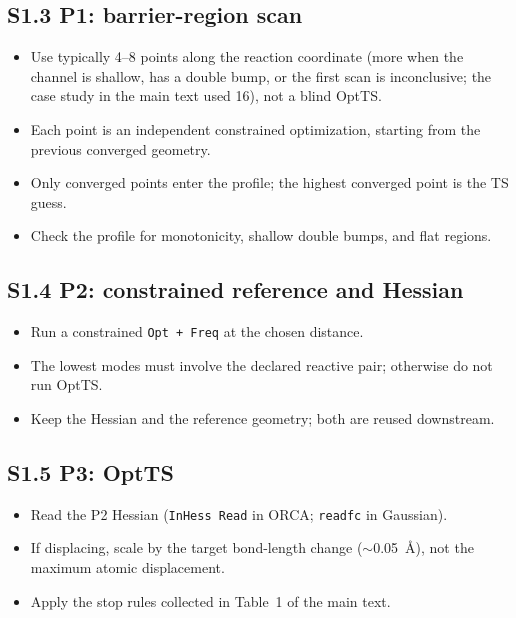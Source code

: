 \documentclass[11pt,a4paper]{article}
\begin{document}
\subsection*{S1.3 P1: barrier-region scan}
\begin{itemize}
\item Use typically 4--8 points along the reaction coordinate (more when the channel is shallow, has a double bump, or the first scan is inconclusive; the case study in the main text used 16), not a blind OptTS.
\item Each point is an independent constrained optimization, starting from the previous converged geometry.
\item Only converged points enter the profile; the highest converged point is the TS guess.
\item Check the profile for monotonicity, shallow double bumps, and flat regions.
\end{itemize}

\subsection*{S1.4 P2: constrained reference and Hessian}
\begin{itemize}
\item Run a constrained \texttt{Opt + Freq} at the chosen distance.
\item The lowest modes must involve the declared reactive pair; otherwise do not run OptTS.
\item Keep the Hessian and the reference geometry; both are reused downstream.
\end{itemize}

\subsection*{S1.5 P3: OptTS}
\begin{itemize}
\item Read the P2 Hessian (\texttt{InHess Read} in ORCA; \texttt{readfc} in Gaussian).
\item If displacing, scale by the target bond-length change ($\sim$0.05~\AA{}), not the maximum atomic displacement.
\item Apply the stop rules collected in Table~1 of the main text.
\end{itemize}
\end{document}
